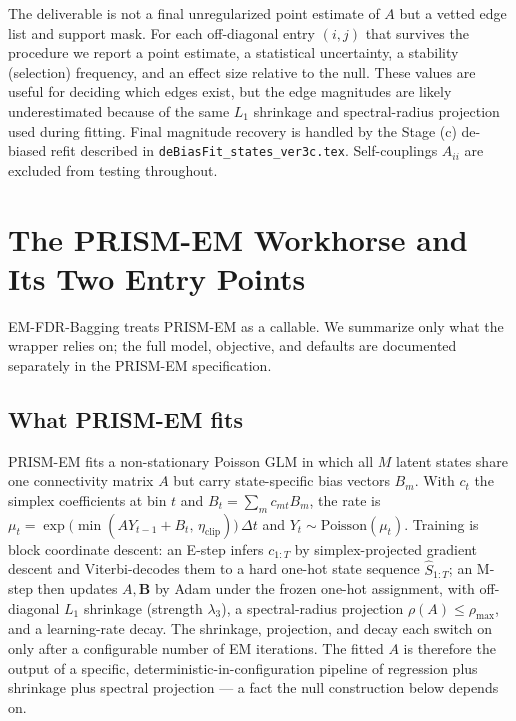 \documentclass[11pt]{article}
\begin{document}
The deliverable is not a final unregularized point estimate of \(A\) but a
vetted edge list and support mask. For each off-diagonal entry \((i,j)\)
that survives the procedure we report a point estimate, a statistical
uncertainty, a stability (selection) frequency, and an effect size relative
to the null. These values are useful for deciding which edges exist, but the
edge magnitudes are likely underestimated because of the same \(L_1\)
shrinkage and spectral-radius projection used during fitting. Final
magnitude recovery is handled by the Stage (c) de-biased refit described in
\texttt{deBiasFit\_states\_ver3c.tex}. Self-couplings \(A_{ii}\) are
excluded from testing throughout.

\section{The PRISM-EM Workhorse and Its Two Entry Points}
\label{sec:workhorse}

EM-FDR-Bagging treats PRISM-EM as a callable. We summarize only what the
wrapper relies on; the full model, objective, and defaults are documented
separately in the PRISM-EM specification.

\subsection{What PRISM-EM fits}

PRISM-EM fits a non-stationary Poisson GLM in which all \(M\) latent states
share one connectivity matrix \(A\) but carry state-specific bias vectors
\(B_m\). With \(c_t\) the simplex coefficients at bin \(t\) and
\(B_t=\sum_m c_{mt}B_m\), the rate is
\(\mu_t=\exp\!\big(\min(A Y_{t-1}+B_t,\,\eta_{\text{clip}})\big)\,\Delta t\)
and \(Y_t\sim\text{Poisson}(\mu_t)\). Training is block coordinate descent:
an E-step infers \(c_{1:T}\) by simplex-projected gradient descent and
Viterbi-decodes them to a hard one-hot state sequence
\(\hat S_{1:T}\); an M-step then updates \(A,\mathbf{B}\) by Adam under the
frozen one-hot assignment, with off-diagonal \(L_1\) shrinkage (strength
\(\lambda_3\)), a spectral-radius projection
\(\rho(A)\le\rho_{\max}\), and a learning-rate decay. The
shrinkage, projection, and decay each switch on only after a configurable
number of EM iterations. The fitted \(A\) is therefore the output of a
specific, deterministic-in-configuration pipeline of regression plus
shrinkage plus spectral projection --- a fact the null construction below
depends on.
\end{document}
